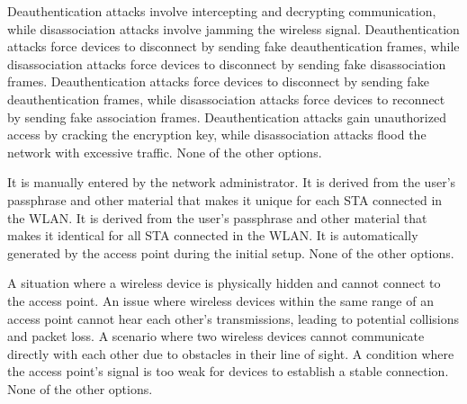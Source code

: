 \begin{checkboxes}
    \choice Deauthentication attacks involve intercepting and decrypting communication, while disassociation attacks involve jamming the wireless signal.
    \CorrectChoice Deauthentication attacks force devices to disconnect by sending fake deauthentication frames, while disassociation attacks force devices to disconnect by sending fake disassociation frames.
    \choice Deauthentication attacks force devices to disconnect by sending fake deauthentication frames, while disassociation attacks force devices to reconnect by sending fake association frames.
    \choice Deauthentication attacks gain unauthorized access by cracking the encryption key, while disassociation attacks flood the network with excessive traffic.
    \choice None of the other options.
\end{checkboxes}


\begin{checkboxes}
    \choice It is manually entered by the network administrator.
    \CorrectChoice It is derived from the user's passphrase and other material that makes it unique for each STA connected in the WLAN.
    \choice It is derived from the user's passphrase and other material that makes it identical for all STA connected in the WLAN.
    \choice It is automatically generated by the access point during the initial setup.
    \choice None of the other options.
\end{checkboxes}

\begin{checkboxes}
    \choice A situation where a wireless device is physically hidden and cannot connect to the access point.
    \CorrectChoice An issue where wireless devices within the same range of an access point cannot hear each other's transmissions, leading to potential collisions and packet loss.
    \choice A scenario where two wireless devices cannot communicate directly with each other due to obstacles in their line of sight.
    \choice A condition where the access point's signal is too weak for devices to establish a stable connection.
    \choice None of the other options.
\end{checkboxes}

